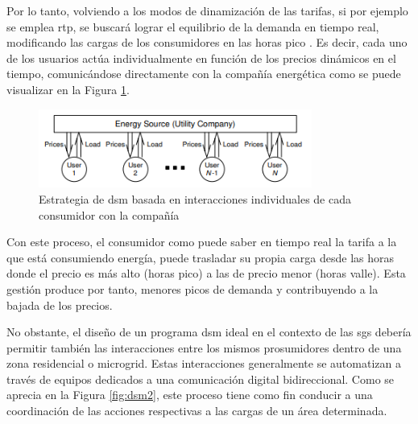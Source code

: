 \vspace{3mm}

Por lo tanto, volviendo a los modos de dinamización de las tarifas, si por ejemplo se emplea \gls{rtp}, se buscará lograr el equilibrio de la demanda en tiempo real, modificando las cargas de los consumidores en las horas pico \cite{rtp}. Es decir, cada uno de los usuarios actúa individualmente en función de los precios dinámicos en el tiempo, comunicándose directamente con la compañía energética como se puede visualizar en la Figura \ref{fig:dsm1}. 

\vspace{3mm}

\begin{figure}[h]
  \centering
  \includegraphics[width=0.8\textwidth]{img/teoria/dsm1.png}
  \caption{Estrategia de \gls{dsm} basada en interacciones individuales de cada consumidor con la compañía \cite{pricing}}
  \label{fig:dsm1}
\end{figure}

\vspace{3mm}

Con este proceso, el consumidor como puede saber en tiempo real la tarifa a la que está consumiendo energía, puede trasladar su propia carga desde las horas donde el precio es más alto (horas pico) a las de precio menor (horas valle). Esta gestión produce por tanto, menores picos de demanda y contribuyendo a la bajada de los precios. \cite{dsm} \cite{pricing}

\vspace{3mm}

No obstante, el diseño de un programa \gls{dsm} ideal en el contexto de las \gls{sg}s debería permitir también las interacciones entre los mismos prosumidores dentro de una zona residencial o microgrid. Estas interacciones generalmente se automatizan a través de equipos dedicados a una comunicación digital bidireccional. Como se aprecia en la Figura \ref{fig:dsm2}, este proceso tiene como fin conducir a una coordinación de las acciones respectivas a las cargas de un área determinada. 

\vspace{3mm}

